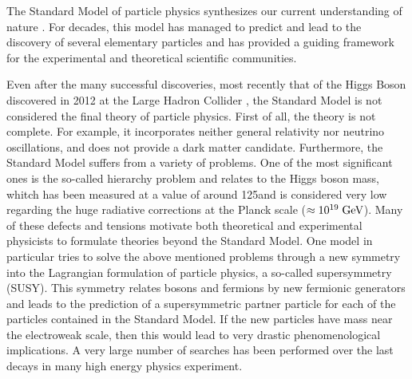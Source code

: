 The Standard Model of particle physics synthesizes our current understanding of nature \cite{Spiesberger:2000ks}. For decades, this model has managed to predict and lead to the discovery of several elementary particles and has provided a guiding framework for the experimental and theoretical scientific communities. 

Even after the many successful discoveries, most recently that of the Higgs Boson discovered in 2012 at the Large Hadron Collider \cite{Aad:2012tfa,Chatrchyan:2012xdj}, the Standard Model is not considered the final theory of particle physics. First of all, the theory is not complete. For example, it incorporates neither general relativity nor neutrino oscillations, and does not provide a dark matter candidate. Furthermore, the Standard Model suffers from a variety of problems. One of the most significant ones is the so-called hierarchy problem and relates to the Higgs boson mass, whitch has been measured at a value of around 125\gev and is considered very low regarding the huge radiative corrections at the Planck scale ($\approx 10^{19}\;\text{Ge}\kern-0.06667em\text{V}$). Many of these defects and tensions motivate both theoretical and experimental physicists to formulate theories beyond the Standard Model. One model in particular tries to solve the above mentioned problems through a new symmetry into the Lagrangian formulation of particle physics, a so-called supersymmetry (SUSY). This symmetry relates bosons and fermions by new fermionic generators and leads to the prediction of a supersymmetric partner particle for each of the particles contained in the Standard Model. If the new particles have mass near the electroweak scale, then this would lead to very drastic phenomenological implications. A very large number of searches has been performed over the last decays in many high energy physics experiment. 


